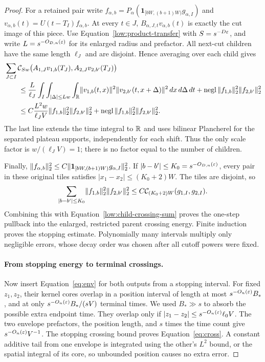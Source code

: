 \begin{proof}
For a retained pair write
$f_{\alpha,b}=P_\alpha(\mathbf1_{[bW,(b+1)W)}g_{\alpha,I})$ and
$v_{\alpha,b}(t)=U(t-T_I)f_{\alpha,b}$. At every $t\in J$,
$B_{\alpha,J,t}v_{\alpha,b}(t)$ is exactly the cut image of this
piece. Use Equation~\eqref{low:product-transfer} with
$S=s^{-D\varepsilon}$, and write $L=s^{-O_{D,n}(\varepsilon)}$ for its enlarged
radius and prefactor. All next-cut children have the same length
$\ell_J$ and are disjoint. Hence averaging over each child gives
\begin{align}
 &\sum_{J\subset I}\mathcal C_{Sw}
       \bigl(A_{1,J}v_{1,b}(T_J),A_{2,J}v_{2,b'}(T_J)\bigr)
 \notag\\
 &\qquad\leq \frac{L}{\ell_J}
    \int_I\int_{|\Delta|\leq Lw}\int_\mathbb R
       \lVert v_{1,b}(t,x)\rVert^2\lVert v_{2,b'}(t,x+\Delta)\rVert^2
                  \,dx\,d\Delta\,dt
       +\mathrm{negl}\,\lVert f_{1,b}\rVert_2^2\lVert f_{2,b'}\rVert_2^2
 \notag\\
 &\qquad\leq C\frac{L^2w}{\ell_JV}
                  \lVert f_{1,b}\rVert_2^2\lVert f_{2,b'}\rVert_2^2
       +\mathrm{negl}\,\lVert f_{1,b}\rVert_2^2\lVert f_{2,b'}\rVert_2^2.
 \label{low:child-crossing-sum}
\end{align}
The last line extends the time integral to $\mathbb R$ and uses bilinear
Plancherel for the separated plateau supports, independently for each
shift. Thus the only scale factor is $w/(\ell_JV)=1$; there is no
factor equal to the number of children.

Finally, $\lVert f_{\alpha,b}\rVert_2^2\leq
C\lVert \mathbf1_{[bW,(b+1)W)}g_{\alpha,I}\rVert_2^2$.
If $|b-b'|\leq K_0=s^{-O_{D,n}(\varepsilon)}$, every pair in these original
tiles satisfies $|x_1-x_2|\leq(K_0+2)W$. The tiles are disjoint, so
\[
 \sum_{|b-b'|\leq K_0}
       \lVert f_{1,b}\rVert_2^2\lVert f_{2,b'}\rVert_2^2
 \leq C\mathcal C_{(K_0+2)W}(g_{1,I},g_{2,I}).
\]
Combining this with Equation~\eqref{low:child-crossing-sum} proves
the one-step pullback into the enlarged, restricted parent crossing
energy. Finite induction proves the stopping estimate. Polynomially
many intervals multiply only negligible errors, whose decay order was
chosen after all cutoff powers were fixed.

\paragraph{From stopping energy to terminal crossings.}
Now insert Equation~\eqref{eq:env} for both outputs from a stopping
interval. For fixed $z_1,z_2$, their kernel cores overlap in a position
interval of length at most $s^{-O_n(\varepsilon)}B_*$, and at only
$s^{-O_n(\varepsilon)}B_*/(sV)$ terminal times. We used $B_*\gg s$ to absorb
the possible extra endpoint time. They overlap only if
$|z_1-z_2|\leq s^{-O_n(\varepsilon)}\ell_0V$. The two envelope prefactors,
the position length, and $s$ times the time count give
$s^{-O_n(\varepsilon)}V^{-1}$. The stopping crossing bound proves
Equation~\eqref{eq:cross}. A constant additive tail from one envelope
is integrated using the other's $L^2$ bound, or the spatial integral of
its core, so unbounded position causes no extra error.


\end{proof}
